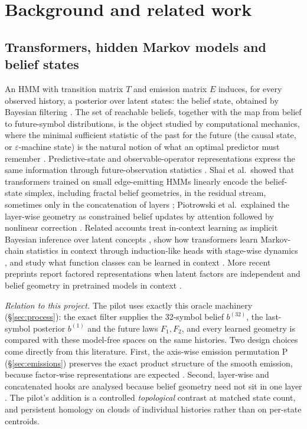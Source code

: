 \documentclass[11pt,a4paper]{article}
\newcommand{\bel}[1]{b^{(#1)}}
\DeclareRobustCommand{\_}{\ifmmode\origunderscore\else\textunderscore\allowbreak\fi}
\begin{document}
\section{Background and related work}\label{sec:related}

\subsection{Transformers, hidden Markov models and belief states}
An HMM with transition matrix $T$ and emission matrix $E$ induces, for every observed history,
a posterior over latent states: the belief state, obtained by Bayesian filtering
\citep{rabiner1989tutorial}. The set of reachable beliefs, together with the map from belief
to future-symbol distributions, is the object studied by computational mechanics, where the
minimal sufficient statistic of the past for the future (the causal state, or
$\varepsilon$-machine state) is the natural notion of what an optimal predictor must remember
\citep{crutchfield1989inferring,shalizi2001computational}. Predictive-state and
observable-operator representations express the same information through future-observation
statistics \citep{jaeger2000oom,singh2004psr}. Shai et al.\ showed that transformers trained
on small edge-emitting HMMs linearly encode the belief-state simplex, including fractal belief
geometries, in the residual stream, sometimes only in the concatenation of layers
\citep{shai2024belief}; Piotrowski et al.\ explained the layer-wise geometry as constrained
belief updates by attention followed by nonlinear correction \citep{piotrowski2025constrained}.
Related accounts treat in-context learning as implicit Bayesian inference over latent concepts
\citep{xie2022icl}, show how transformers learn Markov-chain statistics in context through
induction-like heads with stage-wise dynamics \citep{edelman2024statistical,nichani2024causal,bietti2023birth},
and study what function classes can be learned in context \citep{garg2022incontext}. More
recent preprints report factored representations when latent factors are independent
\citep{shai2026factored} and belief geometry in pretrained models in context
\citep{balcells2026llm}.

\emph{Relation to this project.} The pilot uses exactly this oracle machinery (\S\ref{sec:process}):
the exact filter supplies the 32-symbol belief $\bel{32}$, the last-symbol posterior $\bel{1}$
and the future laws $F_1,F_2$, and every learned geometry is compared with these
model-free spaces on the same histories. Two design choices come directly from this
literature. First, the axis-wise emission permutation P (\S\ref{sec:emissions}) preserves the
exact product structure of the smooth emission, because factor-wise representations are
expected \citep{shai2026factored}. Second, layer-wise and concatenated hooks are analysed
because belief geometry need not sit in one layer \citep{shai2024belief,piotrowski2025constrained}.
The pilot's addition is a controlled \emph{topological} contrast at matched state count, and
persistent homology on clouds of individual histories rather than on per-state centroids.
\end{document}
